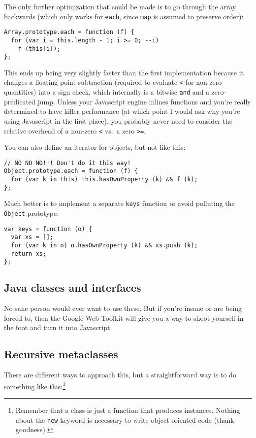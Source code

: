 \documentclass{article}
\begin{document}
    The only further optimization that could be made is to go through the array backwards (which only works for \verb|each|, since \verb|map| is assumed to preserve order):

\begin{verbatim}
Array.prototype.each = function (f) {
  for (var i = this.length - 1; i >= 0; --i)
    f (this[i]);
};
\end{verbatim}

    This ends up being very slightly faster than the first implementation because it changes a floating-point subtraction (required to evaluate \verb|<| for non-zero quantities) into a sign
    check, which internally is a bitwise \verb|and| and a zero-predicated jump. Unless your Javascript engine inlines functions and you're really determined to have killer performance (at
    which point I would ask why you're using Javascript in the first place), you probably never need to consider the relative overhead of a non-zero \verb|<| vs.~a zero \verb|>=|.

    You can also define an iterator for objects, but not like this:

\begin{verbatim}
// NO NO NO!!! Don't do it this way!
Object.prototype.each = function (f) {
  for (var k in this) this.hasOwnProperty (k) && f (k);
};
\end{verbatim}

    Much better is to implement a separate \verb|keys| function to avoid polluting the \verb|Object| prototype:

\begin{verbatim}
var keys = function (o) {
  var xs = [];
  for (var k in o) o.hasOwnProperty (k) && xs.push (k);
  return xs;
};
\end{verbatim}

\subsection {Java classes and interfaces}
    No sane person would ever want to use these. But if you're insane or are being forced to, then the Google Web Toolkit will give you a way to shoot yourself in the foot and turn it into
    Javascript.

\subsection {Recursive metaclasses}
    There are different ways to approach this, but a straightforward way is to do something like this:\footnote{Remember that a class is just a function that produces instances. Nothing about
    the {\tt new} keyword is necessary to write object-oriented code (thank goodness).}
\end{document}
